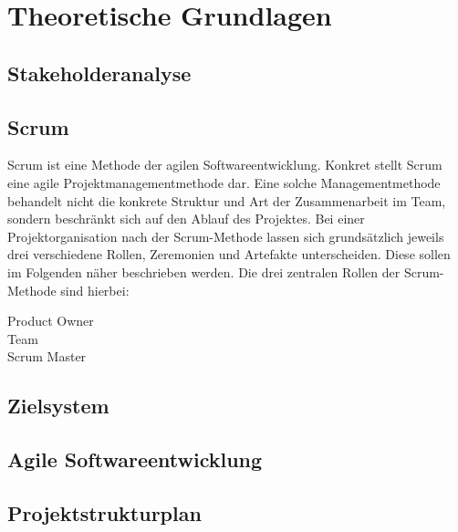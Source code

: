 \section{Theoretische Grundlagen}
\label{sec:Grundlagen}

\subsection{Stakeholderanalyse}
\label{sec:Stakeholderanalyse}

\subsection{Scrum}
\label{sec:Scrum}

Scrum ist eine Methode der agilen Softwareentwicklung. Konkret stellt Scrum eine
agile Projektmanagementmethode dar. Eine solche Managementmethode behandelt
nicht die konkrete Struktur und Art der Zusammenarbeit im Team, sondern
beschränkt sich auf den Ablauf des Projektes. Bei einer Projektorganisation nach
der Scrum-Methode lassen sich grundsätzlich jeweils drei verschiedene Rollen,
Zeremonien und Artefakte unterscheiden. Diese sollen im Folgenden näher
beschrieben werden. Die drei zentralen Rollen der Scrum-Methode sind hierbei:

\begin{description}
\item[Product Owner]
\item[Team]
\item[Scrum Master]
\end{description}


\subsection{Zielsystem}
\label{sec:Zielsystem}

\subsection{Agile Softwareentwicklung}
\label{sec:AgileSoftwareentwicklung}

\subsection{Projektstrukturplan}
\label{sec:Projektstrukturplan}